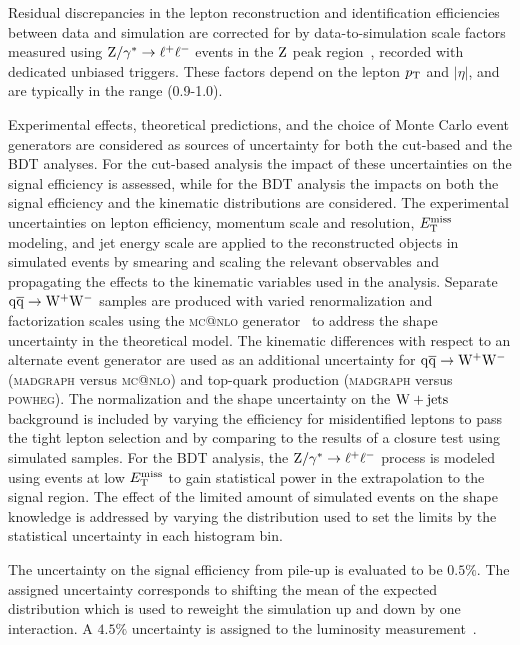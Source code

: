 \documentclass[12pt,twoside,a4paper,cmspaper,final,collab]{cms-tdr}
\begin{document}
Residual discrepancies in the lepton reconstruction and identification
efficiencies between data and simulation are corrected for by
data-to-simulation scale factors measured using $\mathrm{Z}/\gamma^*\to \ell^+\ell^-$ events in the
$\mathrm{Z}$ peak region~\cite{wzxs}, recorded with dedicated unbiased triggers.
These factors depend on the lepton $p_{\mathrm{T}}$ and $|\eta|$, and
are typically in the range (0.9-1.0).

Experimental effects, theoretical predictions, and the choice of Monte Carlo event
generators are considered as sources of uncertainty for both the cut-based and the BDT analyses.
For the cut-based analysis the impact of these uncertainties on the signal efficiency is assessed, while
for the BDT analysis the impacts on both the signal efficiency and the
kinematic distributions are considered.
The experimental uncertainties on lepton efficiency, momentum scale and resolution, $E_{\mathrm{T}}^{\text{miss}}$
modeling, and jet energy scale are applied to the reconstructed objects in simulated events by smearing
and scaling the relevant observables and propagating the effects to the kinematic variables used
in the analysis. Separate $\mathrm{q}\mathrm{\overline{q}}\to \mathrm{W^+}{}\mathrm{W^-}$ samples are produced with varied
renormalization and factorization scales using the \textsc{mc@nlo} generator~\cite{MCatNLO} to address the
shape uncertainty in the theoretical model. The kinematic differences with respect to an
alternate event generator are used as an additional uncertainty for
$\mathrm{q}\mathrm{\overline{q}}\to \mathrm{W^+}{}\mathrm{W^-}$ (\textsc{madgraph} versus \textsc{mc@nlo}) and
top-quark production (\textsc{madgraph} versus \textsc{powheg}).
The normalization and the shape uncertainty on the $\mathrm{W}+\mathrm{jets}$ background is included by varying
the efficiency for misidentified leptons to pass the tight lepton
selection and by comparing to the results of a closure test using simulated samples.
For the BDT analysis, the $\mathrm{Z}/\gamma^*\to \ell^+\ell^-$ process is modeled using events at low
$E_{\mathrm{T}}^{\text{miss}}$ to gain statistical power in the extrapolation to the signal region. The effect of the
limited amount of simulated events on the shape knowledge is addressed by varying the
distribution used to set the limits by the statistical uncertainty in each histogram bin.

The uncertainty on the signal efficiency from pile-up is evaluated to be $0.5\%$.
The assigned uncertainty corresponds to shifting the mean of the
expected distribution which is used to reweight the simulation
up and down by one interaction.
A $4.5\%$ uncertainty is assigned to the luminosity
measurement~\cite{lumiPAS}.
\end{document}

